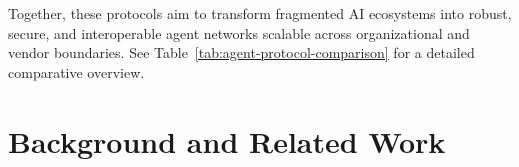 \documentclass{article}
\begin{document}
Together, these protocols aim to transform fragmented AI ecosystems into robust, secure, and interoperable agent networks scalable across organizational and vendor boundaries. See Table~\ref{tab:agent-protocol-comparison} for a detailed comparative overview.









\section{Background and Related Work}
\label{sec:background}
\end{document}
